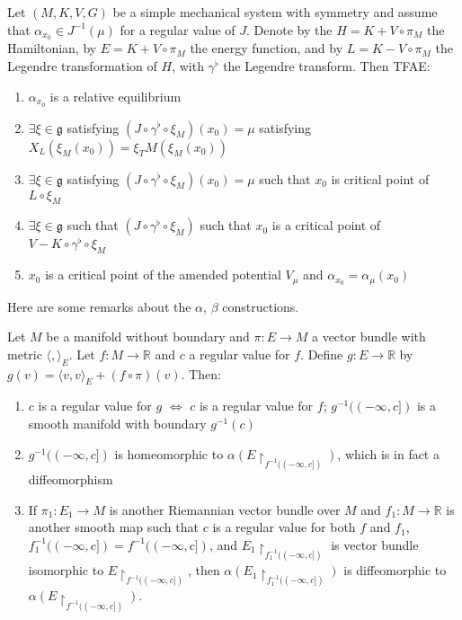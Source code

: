 \begin{thm}

Let $(M,K,V,G)$ be a simple mechanical system with symmetry and assume that $\alpha_{x_0} \in J^{-1}(\mu)$ for a regular value of $J$. Denote by the $H=K+V \circ \pi_M$ the Hamiltonian, by $E=K+V \circ \pi_M$ the energy function, and by $L=K-V \circ \pi_M$ the Legendre transformation of $H$, with $\gamma^{\flat}$ the Legendre transform. Then TFAE:

\begin{enumerate}
    \item $\alpha_{x_0}$ is a relative equilibrium
    \item $\exists \xi \in \mathfrak{g}$ satisfying $(J \circ \gamma^{\flat} \circ \xi_M)(x_0) = \mu$ satisfying $X_L(\xi_M(x_0))=\xi_TM(\xi_M(x_0))$
    \item $\exists \xi \in \mathfrak{g}$ satisfying $(J \circ \gamma^{\flat} \circ \xi_M)(x_0)=\mu$ such that $x_0$ is critical point of $L \circ \xi_M$
    \item $\exists \xi \in \mathfrak{g}$ such that $(J \circ \gamma^{\flat} \circ \xi_M)$ such that $x_0$ is a critical point of $V-K \circ \gamma^{\flat} \circ \xi_M$
    \item $x_0$ is a critical point of the amended potential $V_{\mu}$ and $\alpha_{x_0}=\alpha_{\mu}(x_0)$
\end{enumerate}
\end{thm}

Here are some remarks about the $\alpha$, $\beta$ constructions.

\begin{prop} \label{prop:1}

Let $M$ be a manifold without boundary and $\pi:E \to M$ a vector bundle with metric $\langle, \rangle_E$. Let $f:M \to \mathbb{R}$ and $c$ a regular value for $f$. Define $g: E \to \mathbb{R}$ by $g(v)=\langle v,v \rangle_E + (f \circ \pi)(v)$. Then:
\begin{enumerate}
    \item $c$ is a regular value for $g$ $\iff$ $c$ is a regular value for $f$; $g^{-1}((-\infty,c])$ is a smooth manifold with boundary $g^{-1}(c)$
    \item $g^{-1}((-\infty,c])$ is homeomorphic to $\alpha(E\restriction_{f^{-1}((-\infty,c])})$, which is in fact a diffeomorphism
    \item If $\pi_1:E_1 \to M$ is another Riemannian vector bundle over $M$ and $f_1:M \to \mathbb{R}$ is another smooth map such that $c$ is a regular value for both $f$ and $f_1$, $f^{-1}_1((-\infty,c])=f^{-1}((-\infty,c])$, and $E_1 \restriction_{f^{-1}_1((-\infty,c])} $ is vector bundle isomorphic to $E \restriction_{f^{-1}((-\infty,c])}$, then $\alpha(E_1 \restriction_{f^{-1}_1((-\infty,c])})$ is diffeomorphic to $\alpha(E \restriction_{f^{-1}((-\infty,c])})$.
\end{enumerate}
\end{prop}

